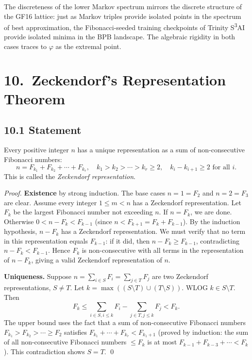The discreteness of the lower Markov spectrum mirrors
the discrete structure of the GF16 lattice:
just as Markov triples provide isolated points in the
spectrum of best approximation, the Fibonacci-seeded
training checkpoints of Trinity S\textsuperscript{3}AI
provide isolated minima in the BPB landscape.
The algebraic rigidity in both cases traces to
$\varphi$ as the extremal point.

\section{10.\ Zeckendorf's Representation Theorem}
\label{sec:gc-zeckendorf}

\subsection{10.1 Statement}
\label{subsec:gc-zeckendorf-stmt}

\begin{theorem}
\label{thm:gc-zeckendorf}
Every positive integer $n$ has a unique representation
as a sum of non-consecutive Fibonacci numbers:
\[
  n = F_{k_1} + F_{k_2} + \cdots + F_{k_r},
  \quad k_1 > k_2 > \cdots > k_r \geq 2,
  \quad k_i - k_{i+1} \geq 2 \text{ for all }i.
\]
This is called the \emph{Zeckendorf representation}.
\end{theorem}

\begin{proof}
\textbf{Existence} by strong induction.
The base cases $n=1=F_2$ and $n=2=F_3$ are clear.
Assume every integer $1 \leq m < n$ has a Zeckendorf
representation.
Let $F_k$ be the largest Fibonacci number not exceeding $n$.
If $n = F_k$, we are done.
Otherwise $0 < n - F_k < F_{k-1}$ (since
$n < F_{k+1} = F_k + F_{k-1}$).
By the induction hypothesis, $n - F_k$ has a Zeckendorf
representation.
We must verify that no term in this representation
equals $F_{k-1}$: if it did, then
$n - F_k \geq F_{k-1}$, contradicting
$n - F_k < F_{k-1}$.
Hence $F_k$ is non-consecutive with all terms in the
representation of $n - F_k$, giving a valid
Zeckendorf representation of $n$.

\textbf{Uniqueness.}
Suppose $n = \sum_{i \in S} F_i = \sum_{j \in T} F_j$
are two Zeckendorf representations, $S \neq T$.
Let $k = \max((S \setminus T) \cup (T \setminus S))$.
WLOG $k \in S \setminus T$.
Then
\[
  F_k \leq \sum_{i \in S, i \leq k} F_i - \sum_{j \in T, j \leq k} F_j
  < F_k.
\]
The upper bound uses the fact that a sum of
non-consecutive Fibonacci numbers $F_{k_1} > F_{k_2}
> \cdots \geq F_2$ satisfies
$F_{k_1} + \cdots + F_{k_r} < F_{k_1+1}$
(proved by induction: the sum of all non-consecutive
Fibonacci numbers $\leq F_k$ is at most $F_{k-1}+F_{k-3}
+\cdots < F_k$).
This contradiction shows $S = T$.
\qed
\end{proof}

